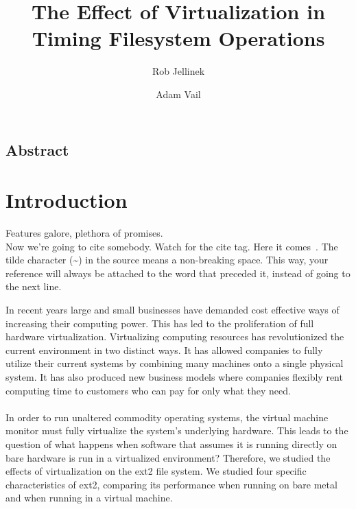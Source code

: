 \documentclass[letterpaper,twocolumn,10pt]{article}
\begin{document}
\date{}

\title{\Large \bf The Effect of Virtualization in Timing Filesystem Operations}

\author{
{\rm Rob Jellinek}\\
\and
{\rm Adam Vail}\\
} %

\maketitle

\thispagestyle{empty}


\subsection*{Abstract}

\section{Introduction}

Features galore, plethora of promises.\\

Now we're going to cite somebody.  Watch for the cite tag.
Here it comes~\cite{Chaum1981,Diffie1976}.  The tilde character (\~{})
in the source means a non-breaking space.  This way, your reference will
always be attached to the word that preceded it, instead of going to the
next line.

In recent years large and small businesses have demanded cost effective ways of increasing their computing power.
This has led to the proliferation of full hardware virtualization.
Virtualizing computing resources has revolutionized the current environment in two distinct ways.
It has allowed companies to fully utilize their current systems by combining many machines onto a single physical system.
It has also produced new business models where companies flexibly rent computing time to customers who can pay for only what they need.

\paragraph{}
In order to run unaltered commodity operating systems, the virtual machine monitor must fully virtualize the system's underlying hardware.
This leads to the question of what happens when software that assumes it is running directly on bare hardware is run in a virtualized environment?
Therefore, we studied the effects of virtualization on the ext2 file system.
We studied four specific characteristics of ext2, comparing its performance when running on bare metal and when running in a virtual machine.
\end{document}
